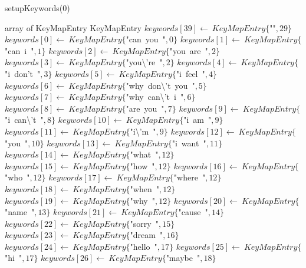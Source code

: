 \documentclass[a4paper,10pt]{article}
\begin{document}
\begin{algorithm}
\caption{setupKeywords(0)}
\begin{algorithmic}[5]
\State {}
\State {}
\State {}
    \State array of KeyMapEntry
  \EndDecl
    \State KeyMapEntry
  \EndDecl
  \State \(keywords[39]\gets\ KeyMapEntry\{\)"{}"{}\(,29\}\)
  \State \(keywords[0]\gets\ KeyMapEntry\{\)"{}can\ you\ "{}\(,0\}\)
  \State \(keywords[1]\gets\ KeyMapEntry\{\)"{}can\ i\ "{}\(,1\}\)
  \State \(keywords[2]\gets\ KeyMapEntry\{\)"{}you\ are\ "{}\(,2\}\)
  \State \(keywords[3]\gets\ KeyMapEntry\{\)"{}you\textbackslash{}'{}re\ "{}\(,2\}\)
  \State \(keywords[4]\gets\ KeyMapEntry\{\)"{}i\ don'{}t\ "{}\(,3\}\)
  \State \(keywords[5]\gets\ KeyMapEntry\{\)"{}i\ feel\ "{}\(,4\}\)
  \State \(keywords[6]\gets\ KeyMapEntry\{\)"{}why\ don\textbackslash{}'{}t\ you\ "{}\(,5\}\)
  \State \(keywords[7]\gets\ KeyMapEntry\{\)"{}why\ can\textbackslash{}'{}t\ i\ "{}\(,6\}\)
  \State \(keywords[8]\gets\ KeyMapEntry\{\)"{}are\ you\ "{}\(,7\}\)
  \State \(keywords[9]\gets\ KeyMapEntry\{\)"{}i\ can\textbackslash{}'{}t\ "{}\(,8\}\)
  \State \(keywords[10]\gets\ KeyMapEntry\{\)"{}i\ am\ "{}\(,9\}\)
  \State \(keywords[11]\gets\ KeyMapEntry\{\)"{}i\textbackslash{}'{}m\ "{}\(,9\}\)
  \State \(keywords[12]\gets\ KeyMapEntry\{\)"{}you\ "{}\(,10\}\)
  \State \(keywords[13]\gets\ KeyMapEntry\{\)"{}i\ want\ "{}\(,11\}\)
  \State \(keywords[14]\gets\ KeyMapEntry\{\)"{}what\ "{}\(,12\}\)
  \State \(keywords[15]\gets\ KeyMapEntry\{\)"{}how\ "{}\(,12\}\)
  \State \(keywords[16]\gets\ KeyMapEntry\{\)"{}who\ "{}\(,12\}\)
  \State \(keywords[17]\gets\ KeyMapEntry\{\)"{}where\ "{}\(,12\}\)
  \State \(keywords[18]\gets\ KeyMapEntry\{\)"{}when\ "{}\(,12\}\)
  \State \(keywords[19]\gets\ KeyMapEntry\{\)"{}why\ "{}\(,12\}\)
  \State \(keywords[20]\gets\ KeyMapEntry\{\)"{}name\ "{}\(,13\}\)
  \State \(keywords[21]\gets\ KeyMapEntry\{\)"{}cause\ "{}\(,14\}\)
  \State \(keywords[22]\gets\ KeyMapEntry\{\)"{}sorry\ "{}\(,15\}\)
  \State \(keywords[23]\gets\ KeyMapEntry\{\)"{}dream\ "{}\(,16\}\)
  \State \(keywords[24]\gets\ KeyMapEntry\{\)"{}hello\ "{}\(,17\}\)
  \State \(keywords[25]\gets\ KeyMapEntry\{\)"{}hi\ "{}\(,17\}\)
  \State \(keywords[26]\gets\ KeyMapEntry\{\)"{}maybe\ "{}\(,18\}\)

\end{algorithmic}
\end{algorithm}
\end{document}
